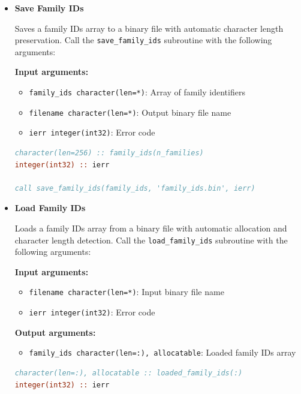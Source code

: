 \documentclass[11pt]{article}
\begin{document}
\begin{enumerate}
\begin{itemize}
\begin{lstlisting}[language=Fortran, caption={Load Gene-Family Mapping}]
call load_gene_to_family(loaded_gene_to_fam, 'gene_to_fam.bin', ierr)
	      	      \end{lstlisting}
	      	      
	      	\item \textbf{Save Family IDs}
	      	      
	      	      Saves a family IDs array to a binary file with automatic character length
	      	      preservation. Call the \texttt{save\_family\_ids} subroutine with the following
	      	      arguments:
	      	      
	      	      \textbf{Input arguments:}
	      	      \begin{itemize}
	      	      	\item \texttt{family\_ids character(len=*)}: Array of family identifiers
	      	      	      
	      	      	\item \texttt{filename character(len=*)}: Output binary file name
	      	      	      
	      	      	\item \texttt{ierr integer(int32)}: Error code
	      	      \end{itemize}
	      	      \begin{lstlisting}[language=Fortran, caption={Save Family IDs}]
character(len=256) :: family_ids(n_families)
integer(int32) :: ierr

call save_family_ids(family_ids, 'family_ids.bin', ierr)
	      	      \end{lstlisting}
	      	      
	      	\item \textbf{Load Family IDs}
	      	      
	      	      Loads a family IDs array from a binary file with automatic allocation and
	      	      character length detection. Call the \texttt{load\_family\_ids} subroutine
	      	      with the following arguments:
	      	      
	      	      \textbf{Input arguments:}
	      	      \begin{itemize}
	      	      	\item \texttt{filename character(len=*)}: Input binary file name
	      	      	      
	      	      	\item \texttt{ierr integer(int32)}: Error code
	      	      \end{itemize}
	      	      \textbf{Output arguments:}
	      	      \begin{itemize}
	      	      	\item \texttt{family\_ids character(len=:), allocatable}: Loaded family
	      	      	      IDs array
	      	      \end{itemize}
	      	      \begin{lstlisting}[language=Fortran, caption={Load Family IDs}]
character(len=:), allocatable :: loaded_family_ids(:)
integer(int32) :: ierr


\end{lstlisting}
\end{itemize}
\end{enumerate}
\end{document}
